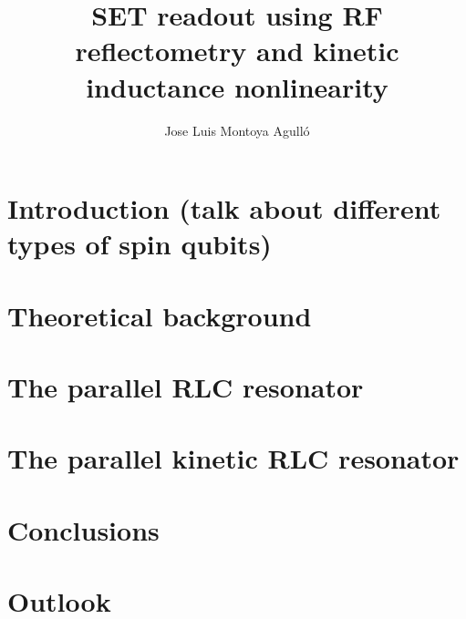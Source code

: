 \documentclass{article}
\title{
\textbf{SET readout using RF reflectometry and kinetic inductance nonlinearity}
}
\author{Jose Luis Montoya Agull\'o}
\date{}
\numberwithin{equation}{section}
\begin{document}
\maketitle
\begin{abstract}
\lipsum[1-1]
\end{abstract}


\newpage
\tableofcontents{}

\newpage
\section{Introduction (talk about different types of spin qubits)}
\label{sec:Intro}


\newpage
\section{Theoretical background}
\label{sec:Theory}


\newpage
\section{The parallel RLC resonator}
\label{sec:ParallelRLC}


\newpage
\section{The parallel kinetic RLC resonator}
\label{sec:KineticRLC}


\newpage
\section{Conclusions}
\label{sec:Conclusions}


\newpage
\section{Outlook} %
\label{sec:Outlook}
% 

%
% 
\end{document}
